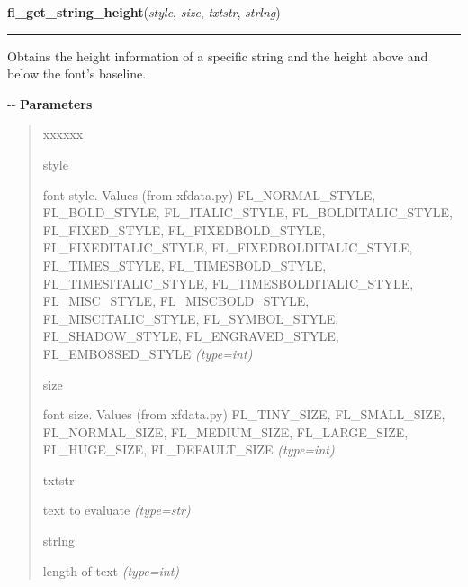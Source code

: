     \label{xformslib:flbasic:fl_get_string_height}

    \vspace{0.5ex}

\hspace{.8\funcindent}\begin{boxedminipage}{\funcwidth}

    \raggedright \textbf{fl\_get\_string\_height}(\textit{style}, \textit{size}, \textit{txtstr}, \textit{strlng})

    \vspace{-1.5ex}

    \rule{\textwidth}{0.5\fboxrule}
\setlength{\parskip}{2ex}

Obtains the height information of a specific string and the height
above and below the font's baseline.

-{}-
\setlength{\parskip}{1ex}
      \textbf{Parameters}
      \vspace{-1ex}

      \begin{quote}
        \begin{Ventry}{xxxxxx}

          \item[style]


font style. Values (from xfdata.py) FL\_NORMAL\_STYLE, FL\_BOLD\_STYLE,
FL\_ITALIC\_STYLE, FL\_BOLDITALIC\_STYLE, FL\_FIXED\_STYLE,
FL\_FIXEDBOLD\_STYLE, FL\_FIXEDITALIC\_STYLE, FL\_FIXEDBOLDITALIC\_STYLE,
FL\_TIMES\_STYLE, FL\_TIMESBOLD\_STYLE, FL\_TIMESITALIC\_STYLE,
FL\_TIMESBOLDITALIC\_STYLE, FL\_MISC\_STYLE, FL\_MISCBOLD\_STYLE,
FL\_MISCITALIC\_STYLE, FL\_SYMBOL\_STYLE, FL\_SHADOW\_STYLE,
FL\_ENGRAVED\_STYLE, FL\_EMBOSSED\_STYLE
            {\it (type=int)}

          \item[size]


font size. Values (from xfdata.py) FL\_TINY\_SIZE, FL\_SMALL\_SIZE,
FL\_NORMAL\_SIZE, FL\_MEDIUM\_SIZE, FL\_LARGE\_SIZE, FL\_HUGE\_SIZE,
FL\_DEFAULT\_SIZE
            {\it (type=int)}

          \item[txtstr]


text to evaluate
            {\it (type=str)}

          \item[strlng]


length of text
            {\it (type=int)}


\end{Ventry}
\end{quote}
\end{boxedminipage}
